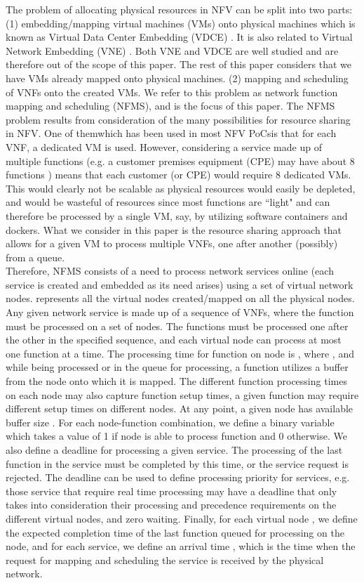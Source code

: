 \documentclass[conference]{IEEEtran}
\begin{document}
The problem of allocating physical resources in NFV can be split into two parts: (1) embedding/mapping virtual machines (VMs) onto physical machines which is known as Virtual Data Center Embedding (VDCE) \cite{Rabbani13}. It is also related to Virtual Network Embedding (VNE) \cite{RashidDissertation, rl, neurofuzzy}. Both VNE and VDCE are well studied and are therefore out of the scope of this paper. The rest of this paper considers that we have \acp{VM} already mapped onto physical machines. (2) mapping and scheduling of VNFs onto the created \acp{VM}. We refer to this problem as network function mapping and scheduling (NFMS), and is the focus of this paper. The NFMS problem results from consideration of the many possibilities for resource sharing in \ac{NFV}. One of themwhich has been used in most NFV PoCsis that for each VNF, a dedicated VM is used. However, considering a service made up of multiple functions (e.g. a customer premises equipment (CPE) may have about 8 functions \cite{MijumbiNFV15}) means that each customer (or CPE) would require 8 dedicated VMs. This would clearly not be scalable as physical resources would easily be depleted, and would be wasteful of resources since most functions are ``light" and can therefore be processed by a single VM, say, by utilizing software containers and dockers. What we consider in this paper is the resource sharing approach that allows for a given VM to process multiple VNFs, one after another (possibly) from a queue.\\
\indent Therefore, NFMS consists of a need to process network services online (each service is created and embedded as its need arises) using a set  of  virtual network nodes.  represents all the virtual nodes created/mapped on all the physical nodes. Any given network service  is made up of a sequence  of  VNFs, where the function  must be processed on a set  of nodes. The functions  must be processed one after the other in the specified sequence, and each virtual node can process at most one function at a time. The processing time for function  on node  is , where , and while being processed or in the queue for processing, a function  utilizes a buffer  from the node onto which it is mapped. The different function processing times on each node may also capture function setup times, a given function may require different setup times on different nodes. At any point, a given node  has available buffer size . For each node-function combination, we define a binary variable  which takes a value of 1 if node  is able to process function  and 0 otherwise. We also define a deadline  for processing a given service. The processing of the last function in the service must be completed by this time, or the service request is rejected. The deadline can be used to define processing priority for services, e.g. those service that require real time processing may have a deadline that only takes into consideration their processing and precedence requirements on the different virtual nodes, and zero waiting. Finally, for each virtual node , we define the expected completion time  of the last function queued for processing on the node, and for each service, we define an arrival time , which is the time when the request for mapping and scheduling the service is received by the physical network.\\
\end{document}
